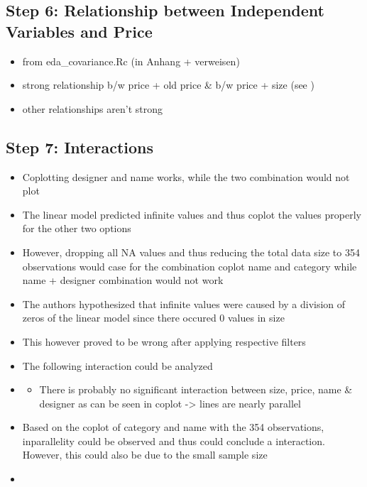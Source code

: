 \documentclass[a4paper, nobind]{templates/ociamthesis}
\providecommand{\tightlist}{%
  \setlength{\itemsep}{0pt}\setlength{\parskip}{0pt}}
\begin{document}
\hypertarget{step-6-relationship-between-independent-variables-and-price}{%
\subsection{Step 6: Relationship between Independent Variables and Price}\label{step-6-relationship-between-independent-variables-and-price}}

\begin{itemize}
\tightlist
\item
  from eda\_covariance.Rc (in Anhang + verweisen)
\item
  strong relationship b/w price + old price \& b/w price + size (see )
\item
  other relationships aren't strong
\end{itemize}

\hypertarget{step-7-interactions}{%
\subsection{Step 7: Interactions}\label{step-7-interactions}}

\begin{itemize}
\item
  Coplotting designer and name works, while the two combination would not plot
\item
  The linear model predicted infinite values and thus coplot the values properly for the other two options
\item
  However, dropping all NA values and thus reducing the total data size to 354 observations would case for the combination coplot name and category while name + designer combination would not work
\item
  The authors hypothesized that infinite values were caused by a division of zeros of the linear model since there occured 0 values in size
\item
  This however proved to be wrong after applying respective filters
\item
  The following interaction could be analyzed
\item
  \begin{itemize}
  \tightlist
  \item
    There is probably no significant interaction between size, price, name \& designer as can be seen in coplot -\textgreater{} lines are nearly parallel
  \end{itemize}
\item
  Based on the coplot of category and name with the 354 observations, inparallelity could be observed and thus could conclude a interaction. However, this could also be due to the small sample size
\item
\end{itemize}
\end{document}
